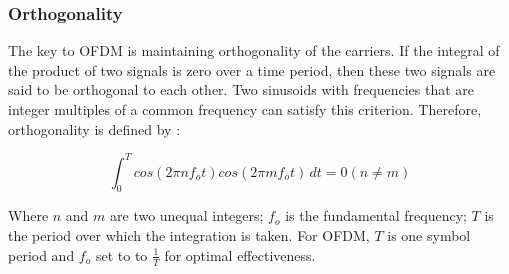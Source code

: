\subsubsection{Orthogonality}

The key to OFDM is maintaining orthogonality of the carriers. If the integral of the product of two signals is zero over a time period, then these two signals are said to be orthogonal to each other. Two sinusoids with frequencies that are integer multiples of a common frequency can satisfy this criterion. Therefore, orthogonality is defined by :

\begin{equation}\label{eq1}
    \int_{0}^{T} cos(2 \pi n f_o t) cos(2 \pi m f_o t) \,dt = 0 (n \neq m) 
\end{equation}

Where $n$ and $m$ are two unequal integers; $f_o$ is the fundamental frequency; $T$ is the period over which the integration is taken. For OFDM, $T$ is one symbol period and $f_o$ set to to $\frac{1}{T}$ for optimal effectiveness.
